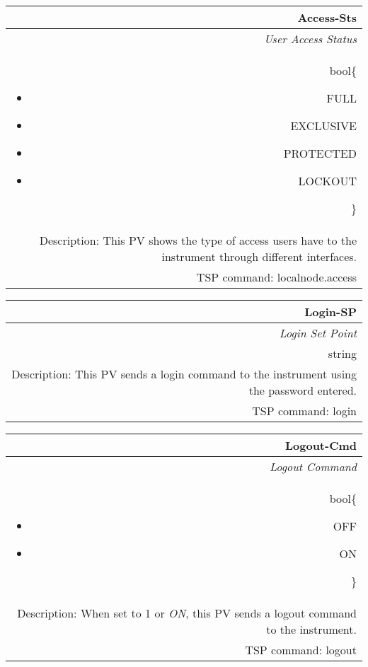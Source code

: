 \documentclass[openany]{article}
\begin{document}
		\begin{tabular}{N}
			\hline
			\bfseries Access-Sts\label{pv:access-sts} \\ \hline
			\emph{User Access Status} \\
			bool\{\begin{itemize}[noitemsep]
				\small
				\item[] FULL
				\item[] EXCLUSIVE
				\item[] PROTECTED
				\item[] LOCKOUT
			\end{itemize}\} \\
			Description: This PV shows the type of access users have to the instrument through different interfaces. \\
			TSP command: localnode.access
		\end{tabular}

		\begin{tabular}{N}
			\hline
			\bfseries Login-SP\label{pv:login-sp} \\ \hline
			\emph{Login Set Point} \\
			string \\
			Description: This PV sends a login command to the instrument using the password entered. \\
			TSP command: login
		\end{tabular}

		\begin{tabular}{N}
			\hline
			\bfseries Logout-Cmd\label{pv:logout-cmd} \\ \hline
			\emph{Logout Command} \\
			bool\{\begin{itemize}[noitemsep]
				\small
				\item[] OFF
				\item[] ON
			\end{itemize}\} \\
			Description: When set to 1 or \emph{ON}, this PV sends a logout command to the instrument. \\
			TSP command: logout
		\end{tabular}
\end{document}
